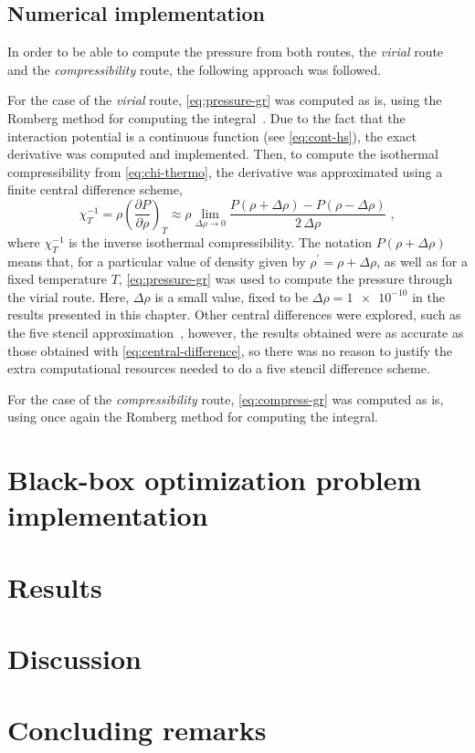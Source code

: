 \subsection{Numerical implementation}
In order to be able to compute the pressure from both routes, the \emph{virial} route and the \emph{compressibility} route, the following approach was followed.

For the case of the \emph{virial} route, \autoref{eq:pressure-gr} was computed as is, using 
the Romberg method for computing the integral~\cite{hammingNumericalMethodsScientists2012}. 
Due to the fact that the interaction potential is a continuous function (see 
\autoref{eq:cont-hs}), the exact derivative was computed and implemented. Then, to compute 
the isothermal compressibility from \autoref{eq:chi-thermo}, the derivative was 
approximated using a finite central difference scheme,
\begin{equation}
    \chi_{T}^{-1} = \rho { \left( \frac{\partial P}{\partial \rho} \right) }_{T}
    \approx \rho \lim_{\Delta \rho \to 0} \frac{P(\rho + \Delta \rho) - P(\rho - \Delta \rho)}{2 \, \Delta \rho}
    \; ,
    \label{eq:central-difference}
\end{equation}
where \(\chi_{T}^{-1}\) is the inverse isothermal compressibility. The notation 
\(P(\rho + \Delta \rho)\) means that, for a particular value of density given by 
\(\rho^{\prime}=\rho + \Delta \rho\), as well as for a fixed temperature \(T\), 
\autoref{eq:pressure-gr} was used to compute the 
pressure through the virial route. Here, \(\Delta \rho\) is a small value, fixed to be
\(\Delta \rho=\num{1e-10}\) in the results presented in this chapter. Other central 
differences were explored, such as the five stencil 
approximation~\cite{hammingNumericalMethodsScientists2012}, however, the results obtained 
were as accurate as those obtained with \autoref{eq:central-difference}, so there was no 
reason to justify the extra computational resources needed to do a five stencil difference 
scheme.

For the case of the \emph{compressibility} route, \autoref{eq:compress-gr} was computed as 
is, using once again the Romberg method for computing the integral.

\section{Black-box optimization problem implementation}
\section{Results}
\section{Discussion}
\section{Concluding remarks}